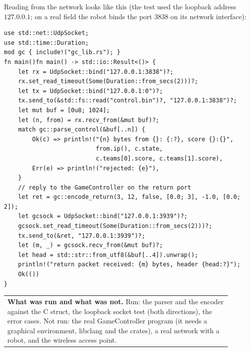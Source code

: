 Reading from the network looks like this (the test used the loopback address $127.0.0.1$; on a real field the robot binds the port $3838$ on its network interface):

\begin{verbatim}
use std::net::UdpSocket;
use std::time::Duration;
mod gc { include!("gc_lib.rs"); }
fn main()fn main() -> std::io::Result<()> {
    let rx = UdpSocket::bind("127.0.0.1:3838")?;
    rx.set_read_timeout(Some(Duration::from_secs(2)))?;
    let tx = UdpSocket::bind("127.0.0.1:0")?;
    tx.send_to(&std::fs::read("control.bin")?, "127.0.0.1:3838")?;
    let mut buf = [0u8; 1024];
    let (n, from) = rx.recv_from(&mut buf)?;
    match gc::parse_control(&buf[..n]) {
        Ok(c) => println!("{n} bytes from {}: {:?}, score {}:{}",
                          from.ip(), c.state,
                          c.teams[0].score, c.teams[1].score),
        Err(e) => println!("rejected: {e}"),
    }
    // reply to the GameController on the return port
    let ret = gc::encode_return(3, 12, false, [0.0; 3], -1.0, [0.0; 2]);
    let gcsock = UdpSocket::bind("127.0.0.1:3939")?;
    gcsock.set_read_timeout(Some(Duration::from_secs(2)))?;
    tx.send_to(&ret, "127.0.0.1:3939")?;
    let (m, _) = gcsock.recv_from(&mut buf)?;
    let head = std::str::from_utf8(&buf[..4]).unwrap();
    println!("return packet received: {m} bytes, header {head:?}");
    Ok(())
}
\end{verbatim}

\begin{center}
\small
\begin{tabular}{p{0.9\linewidth}}
\textbf{What was run and what was not.} Run: the parser and the encoder against the C struct, the loopback socket test (both directions), the error cases. Not run: the real GameController program (it needs a graphical environment, libclang and the crates), a real network with a robot, and the wireless access point.\\
\end{tabular}
\end{center}

